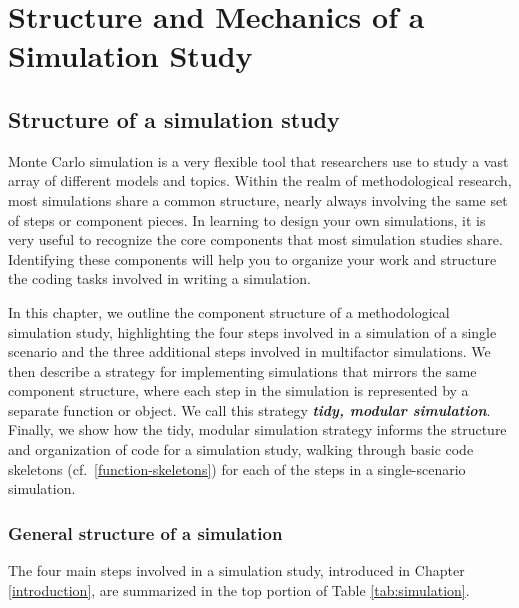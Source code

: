\documentclass[
]{book}
\begin{document}
\part{Structure and Mechanics of a Simulation Study}\label{part-structure-and-mechanics-of-a-simulation-study}

\chapter{Structure of a simulation study}\label{structure-of-a-simulation-study}

Monte Carlo simulation is a very flexible tool that researchers use to study a vast array of different models and topics.
Within the realm of methodological research, most simulations share a common structure, nearly always involving the same set of steps or component pieces.
In learning to design your own simulations, it is very useful to recognize the core components that most simulation studies share.
Identifying these components will help you to organize your work and structure the coding tasks involved in writing a simulation.

In this chapter, we outline the component structure of a methodological simulation study, highlighting the four steps involved in a simulation of a single scenario and the three additional steps involved in multifactor simulations.
We then describe a strategy for implementing simulations that mirrors the same component structure, where each step in the simulation is represented by a separate function or object.
We call this strategy \textbf{\emph{tidy, modular simulation}}.
Finally, we show how the tidy, modular simulation strategy informs the structure and organization of code for a simulation study, walking through basic code skeletons (cf.~\ref{function-skeletons}) for each of the steps in a single-scenario simulation.

\section{General structure of a simulation}\label{general-structure-of-a-simulation}

The four main steps involved in a simulation study, introduced in Chapter \ref{introduction}, are summarized in the top portion of Table \ref{tab:simulation}.
\end{document}
